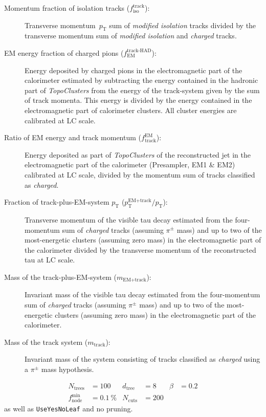 \begin{description}
\item[Momentum fraction of isolation tracks ($f_\text{iso}^\text{track}$):]
  Transverse momentum~$p_\text{T}$ sum of \emph{modified isolation} tracks
  divided by the transverse momentum sum of \emph{modified isolation} and
  \emph{charged} tracks.

\item[EM energy fraction of charged pions ($f_\text{EM}^\text{track-HAD}$):]
  Energy deposited by charged pions in the electromagnetic part of the
  calorimeter estimated by subtracting the energy contained in the hadronic part
  of \emph{TopoClusters} from the energy of the track-system given by the sum of
  track momenta. This energy is divided by the energy contained in the
  electromagnetic part of calorimeter clusters. All cluster energies are
  calibrated at LC scale.

\item[Ratio of EM energy and track momentum ($f_\text{track}^\text{EM}$):]
  Energy deposited as part of \emph{TopoClusters} of the reconstructed jet in
  the electromagnetic part of the calorimeter (Presampler, EM1 \& EM2)
  calibrated at LC scale, divided by the momentum sum of tracks classified as
  \emph{charged}.

\item[Fraction of track-plus-EM-system $p_\text{T}$
  ($p_\text{T}^\text{EM+track} / p_\text{T}$):] Transverse momentum of the
  visible tau decay estimated from the four-momentum sum of \emph{charged}
  tracks (assuming $\pi^\pm$ mass) and up to two of the most-energetic clusters
  (assuming zero mass) in the electromagnetic part of the calorimeter divided by
  the transverse momentum of the reconstructed tau at LC scale.

\item[Mass of the track-plus-EM-system ($m_\text{EM+track}$):] Invariant mass of
  the visible tau decay estimated from the four-momentum sum of \emph{charged}
  tracks (assuming $\pi^\pm$ mass) and up to two of the most-energetic clusters
  (assuming zero mass) in the electromagnetic part of the calorimeter.

\item[Mass of the track system ($m_\text{track}$):] Invariant mass of
  the system consisting of tracks classified as \emph{charged} using a $\pi^\pm$ mass
  hypothesis.
\end{description}


\begin{align*}
  N_\text{trees} &= 100 & d_\text{tree} &= 8 & \beta &= 0.2 \\
  f_\text{node}^\text{min} &= \SI{0.1}{\percent} & N_\text{cuts} &= 200
\end{align*}
as well as \texttt{UseYesNoLeaf} and no pruning.

